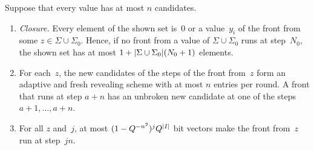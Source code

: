 \begin{lemma}\label{lem:front}
Suppose that every value has at most $n$ candidates.
\begin{enumerate}[label=(\alph*)]
\item \emph{Closure.} Every element of the shown set is~$0$ or a value~$y_i$ of the front from some $z\in\Sigma\cup\Sigma_0$. Hence,
if no front from a value of $\Sigma\cup\Sigma_0$ runs at step~$N_0$, the shown set has at most $1+\lvert \Sigma\cup\Sigma_0 \rvert(N_0+1)$
elements.
\item For each~$z$, the new candidates of the steps of the front from~$z$ form an adaptive and fresh revealing scheme with at
most $n$ entries per round. A front that runs at step $a+n$ has an unbroken new candidate at one of the steps $a+1,\dots,a+n$.
\item For all $z$ and~$j$, at most $(1-Q^{-n^2})^jQ^{\lvert I \rvert}$ bit vectors make the front from~$z$ run at step~$jn$.
\end{enumerate}
\end{lemma}

